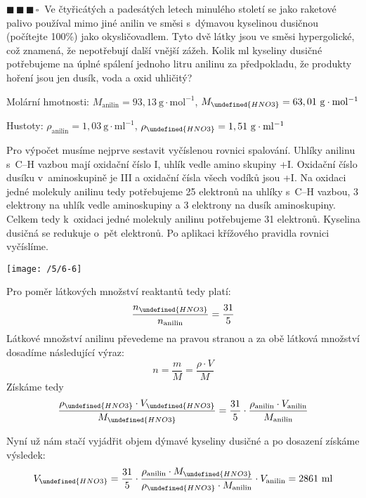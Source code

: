 \documentclass{book}
\let\ch\undefined
\newcommand{\tri}{$\blacksquare \, \blacksquare \, \blacksquare \, \square \; \; $}
\renewenvironment{quotation}{\par}{\par} %
\begin{document}
\newpage %
\begin{quotation}
\tri Ve čtyřicátých a padesátých letech minulého století se jako raketové
palivo používal mimo jiné anilin ve směsi s~dýmavou kyselinou dusičnou
(počítejte 100\%) jako okysličovadlem. Tyto dvě látky jsou ve směsi
hypergolické, což znamená, že nepotřebují další vnější zážeh. Kolik
ml kyseliny dusičné potřebujeme na úplné spálení jednoho litru anilinu
za předpokladu, že produkty hoření jsou jen dusík, voda a oxid uhličitý?

Molární hmotnosti: $M_{\mathrm{anilin}}=93,13\ \mathrm{g\cdot mol^{-1}}$,
$M_{\ch{HNO3}}=63,01\ \mathrm{g\cdot mol^{-1}}$

Hustoty: $\rho_{\mathrm{anilin}}=1,03\ \mathrm{g\cdot ml^{-1}}$,
$\rho_{\ch{HNO3}}=1,51\ \mathrm{g\cdot ml^{-1}}$
\end{quotation} \dotfill \par 
Pro výpočet musíme nejprve sestavit vyčíslenou rovnici spalování.
Uhlíky anilinu s~C--H vazbou mají oxidační číslo \textminus I, uhlík
vedle amino skupiny +I. Oxidační číslo dusíku v~aminoskupině je \textminus III
a oxidační čísla všech vodíků jsou +I. Na oxidaci jedné molekuly anilinu
tedy potřebujeme 25 elektronů na uhlíky s~C--H vazbou, 3 elektrony
na uhlík vedle aminoskupiny a 3 elektrony na dusík aminoskupiny. Celkem
tedy k~oxidaci jedné molekuly anilinu potřebujeme 31 elektronů. Kyselina
dusičná se redukuje o~pět elektronů. Po aplikaci křížového pravidla
rovnici vyčíslíme. 
\begin{center}
\texttt{[image: /5/6-6]} 
\par\end{center}

Pro poměr látkových množství reaktantů tedy platí: 
\[
\frac{n_{\ch{HNO3}}}{n_{\mathrm{anilin}}}=\frac{31}{5}
\]
Látkové množství anilinu převedeme na pravou stranou a za obě látková
množství dosadíme následující výraz: 
\[
n=\frac{m}{M}=\frac{\rho\cdot V}{M}
\]
Získáme tedy 
\[
\frac{\rho_{\ch{HNO3}}\cdot V_{\ch{HNO3}}}{M_{\ch{HNO3}}}=\frac{31}{5}\cdot\frac{\rho_{\mathrm{anilin}}\cdot V_{\mathrm{anilin}}}{M_{\mathrm{anilin}}}
\]

Nyní už nám stačí vyjádřit objem dýmavé kyseliny dusičné a po dosazení
získáme výsledek: 
\[
V_{\ch{HNO3}}=\frac{31}{5}\cdot\frac{\rho_{\mathrm{anilin}}\cdot M_{\ch{HNO3}}}{\rho_{\ch{HNO3}}\cdot M_{\mathrm{anilin}}}\cdot V_{\mathrm{anilin}}=2861\mathrm{~ml}
\]
\end{document}
